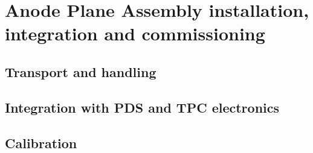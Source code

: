 \chapter{Anode Plane Assembly installation, integration and commissioning}
\label{ch:fdsp-apa-install}

\section{Transport and handling}
\label{sec:fdsp-apa-install-transport}


\section{Integration with PDS and TPC electronics}
\label{sec:fdsp-apa-install-pds-elec}


\section{Calibration}
\label{sec:fdsp-apa-install-calib}




